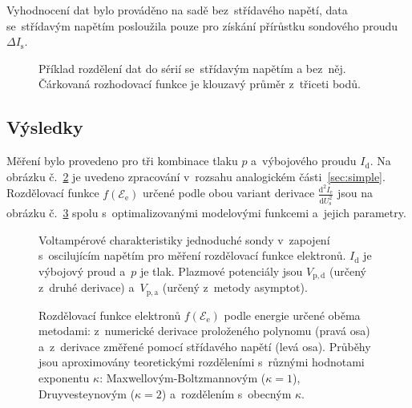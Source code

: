 \documentclass{protokol}
\newcommand\pres{p}
\newcommand\idisch{I_\mathrm{d}}
\newcommand\iprobe{I_\mathrm{s}}
\newcommand\ielec{I_\mathrm{e}}
\newcommand\plpota{V_\mathrm{p,a}}
\newcommand\plpotd{V_\mathrm{p,d}}
\newcommand\uprobe{U_\mathrm{s}}
\newcommand\didu{\frac{\mathrm d^2 \ielec}{\mathrm d \uprobe^2}}
\newcommand\enelec{\mathcal E_\mathrm{e}}
\newcommand\eedf{f(\enelec)}
\begin{document}
Vyhodnocení dat bylo prováděno na sadě bez~střídavého napětí,
data se~střídavým napětím posloužila pouze pro získání přírůstku
sondového proudu $\Delta\iprobe$.

\begin{figure}[hbp]
	\centering
	
	\caption{Příklad rozdělení dat do sérií se~střídavým napětím a bez~něj.
		Čárkovaná rozhodovací funkce je klouzavý průměr z~třiceti bodů.}
	\label{fig:separation}
\end{figure}

\subsection{Výsledky}
\label{sec:results-eedf}
Měření bylo provedeno pro tři kombinace tlaku $\pres$ a~výbojového
proudu $\idisch$.
Na obrázku č.~\ref{fig:simple2-vac} je uvedeno zpracování v~rozsahu
analogickém části~\ref{sec:simple}.
Rozdělovací funkce $\eedf$ určené podle obou variant derivace $\didu$
jsou na obrázku č.~\ref{fig:eedf} spolu s~optimalizovanými modelovými
funkcemi a~jejich parametry.

\begin{figure}[p]
	\centering
	
	
	\par\smallskip
	
	
	\par\smallskip
	
	
	\caption{Voltampérové charakteristiky jednoduché sondy
		v~zapojení s~oscilujícím napětím
		pro měření rozdělovací funkce elektronů.
		$\idisch$ je výbojový proud a~$\pres$ je tlak.
		Plazmové potenciály jsou $\plpotd$ (určený z~druhé derivace)
		a~$\plpota$ (určený z~metody asymptot).}
	\label{fig:simple2-vac}
\end{figure}

\begin{figure}[p]
	\centering
	
	\par\smallskip
	
	\par\smallskip
	
	\caption{Rozdělovací funkce elektronů $\eedf$ podle energie určené
		oběma metodami: z~numerické derivace proloženého polynomu (pravá osa)
		a~z~derivace změřené pomocí střídavého napětí (levá osa).
		Průběhy jsou aproximovány teoretickými rozděleními s~různými hodnotami
		exponentu $\kappa$:
		Max\-wellovým-Boltzmannovým ($\kappa = 1$),
		Druyvesteynovým ($\kappa = 2$)
		a~rozdělením s~obecným $\kappa$.}
	\label{fig:eedf}
\end{figure}
\end{document}

